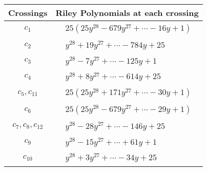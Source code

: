 \documentclass[1p]{elsarticle_modified}
\theoremstyle{definition}
\begin{document}
\begin{tabular}{m{50pt}|m{274pt}}
Crossings & \hspace{64pt}Riley Polynomials at each crossing \\
\hline $$\begin{aligned}c_{1}\end{aligned}$$&$\begin{aligned}
&25(25 y^{28}-679 y^{27}+\cdots-16 y+1)
\end{aligned}$\\
\hline $$\begin{aligned}c_{2}\end{aligned}$$&$\begin{aligned}
&y^{28}+19 y^{27}+\cdots-784 y+25
\end{aligned}$\\
\hline $$\begin{aligned}c_{3}\end{aligned}$$&$\begin{aligned}
&y^{28}-7 y^{27}+\cdots-125 y+1
\end{aligned}$\\
\hline $$\begin{aligned}c_{4}\end{aligned}$$&$\begin{aligned}
&y^{28}+8 y^{27}+\cdots-614 y+25
\end{aligned}$\\
\hline $$\begin{aligned}c_{5},c_{11}\end{aligned}$$&$\begin{aligned}
&25(25 y^{28}+171 y^{27}+\cdots-30 y+1)
\end{aligned}$\\
\hline $$\begin{aligned}c_{6}\end{aligned}$$&$\begin{aligned}
&25(25 y^{28}-679 y^{27}+\cdots-29 y+1)
\end{aligned}$\\
\hline $$\begin{aligned}c_{7},c_{8},c_{12}\end{aligned}$$&$\begin{aligned}
&y^{28}-28 y^{27}+\cdots-146 y+25
\end{aligned}$\\
\hline $$\begin{aligned}c_{9}\end{aligned}$$&$\begin{aligned}
&y^{28}-15 y^{27}+\cdots+61 y+1
\end{aligned}$\\
\hline $$\begin{aligned}c_{10}\end{aligned}$$&$\begin{aligned}
&y^{28}+3 y^{27}+\cdots-34 y+25
\end{aligned}$\\
\hline
\end{tabular}\\~\\
\end{document}
